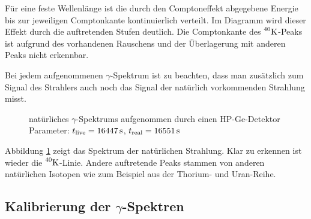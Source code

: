 		Für eine feste Wellenlänge ist die durch den Comptoneffekt abgegebene Energie bis zur jeweiligen Comptonkante kontinuierlich verteilt.
		Im Diagramm wird dieser Effekt durch die auftretenden Stufen deutlich.
		Die Comptonkante des $\prescript{40}{}{\mathrm{K}}$-Peaks ist aufgrund des vorhandenen Rauschens und der Überlagerung mit anderen Peaks nicht erkennbar.

		Bei jedem aufgenommenen $\gamma$-Spektrum ist zu beachten, dass man zusätzlich zum Signal des Strahlers auch noch das Signal der natürlich vorkommenden Strahlung misst.

		\begin{figure}[htb]
			\centering
			
			\caption{natürliches $\gamma$-Spektrums aufgenommen durch einen HP-Ge-Detektor \\ Parameter: $t_{\mathrm{live}}=16447\, \mathrm{s}$, $t_{\mathrm{real}}=16551\, \mathrm{s}$}
			\label{fig:back-1}
		\end{figure}

		Abbildung \ref{fig:back-1} zeigt das Spektrum der natürlichen Strahlung.
		Klar zu erkennen ist wieder die $\prescript{40}{}{\mathrm{K}}$-Linie.
		Andere auftretende Peaks stammen von anderen natürlichen Isotopen wie zum Beispiel aus der Thorium- und Uran-Reihe.
	

	\FloatBarrier
	\subsection{Kalibrierung der $\gamma$-Spektren}
	\label{ssec:kalibrierung}
	
